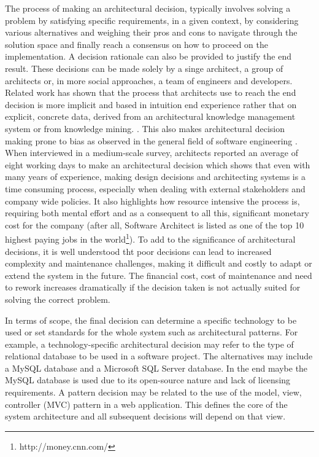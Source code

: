         The process of making an architectural decision, typically involves solving a problem by satisfying specific requirements, in a given context, by considering various alternatives and weighing their pros and cons to navigate through the solution space and finally reach a consensus on how to proceed on the implementation. A decision rationale can also be provided to justify the end result. These decisions can be made solely by a singe architect, a group of architects or, in more social approaches, a team of engineers and developers. Related work has shown that the process that architects use to reach the end decision is more implicit and based in intuition end experience rather that on explicit, concrete data, derived from an architectural knowledge management system or from knowledge mining. \cite{Architecture-reasoning}. This also makes architectural decision making prone to bias as observed in the general field of software engineering \cite{bias_in_software_eng}. When interviewed in a medium-scale survey, architects reported an average of eight working days to make an architectural decision which shows that even with many years of experience, making design decisions and architecting systems is a time consuming process, especially when dealing with external stakeholders and company wide policies. It also highlights how resource intensive the process is, requiring both mental effort and as a consequent to all this, significant monetary cost for the company\cite{archtitect_survey} (after all, Software Architect is listed as one of the top 10 highest paying jobs in the world\footnote{http://money.cnn.com/}). To add to the significance of architectural decisions, it is well understood tht poor decisions can lead to increased complexity and maintenance challenges, making it difficult and costly to adapt or extend the system in the future. The financial cost, cost of maintenance and need to rework increases dramatically if the decision taken is not actually suited for solving the correct problem.  
        
        In terms of scope, the final decision can determine a specific technology to be used \cite{developer-study-arch-decisions}or set standards for the whole system such as architectural patterns. For example, a technology-specific architectural decision may refer to the type of relational database to be used in a software project. The alternatives may include a MySQL database and a Microsoft SQL Server database. In the end maybe the MySQL database is used due to its open-source nature and lack of licensing requirements. A pattern decision may be related to the use of the model, view, controller (MVC) pattern in a web application. This defines the core of the system architecture and all subsequent decisions will depend on that view.

